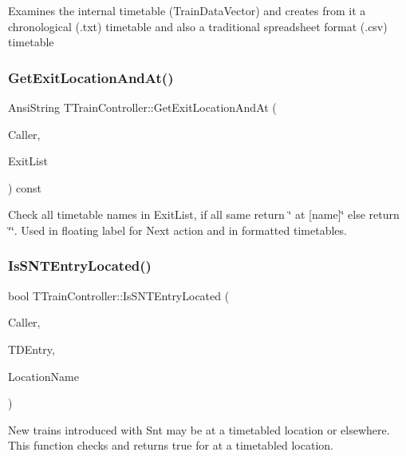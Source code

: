Examines the internal timetable (Train\+Data\+Vector) and creates from it a chronological (.txt) timetable and also a traditional spreadsheet format (.csv) timetable \mbox{\label{class_t_train_controller_ae6c904f201d8bb23b3c0714226244890}} 
\subsubsection{\texorpdfstring{Get\+Exit\+Location\+And\+At()}{GetExitLocationAndAt()}}
{\footnotesize\ttfamily Ansi\+String T\+Train\+Controller\+::\+Get\+Exit\+Location\+And\+At (\begin{DoxyParamCaption}\item[{int}]{Caller,  }\item[{T\+Exit\+List \&}]{Exit\+List }\end{DoxyParamCaption}) const}

Check all timetable names in Exit\+List, if all same return \char`\"{} at \mbox{[}name\mbox{]}\char`\"{} else return \char`\"{}\char`\"{}. Used in floating label for Next action and in formatted timetables. \mbox{\label{class_t_train_controller_a61cdbf0085d24c76aa84e7d5e1d11ead}} 
\subsubsection{\texorpdfstring{Is\+S\+N\+T\+Entry\+Located()}{IsSNTEntryLocated()}}
{\footnotesize\ttfamily bool T\+Train\+Controller\+::\+Is\+S\+N\+T\+Entry\+Located (\begin{DoxyParamCaption}\item[{int}]{Caller,  }\item[{const \mbox{\hyperlink{class_t_train_data_entry}{T\+Train\+Data\+Entry}} \&}]{T\+D\+Entry,  }\item[{Ansi\+String \&}]{Location\+Name }\end{DoxyParamCaption})}

New trains introduced with \textquotesingle{}Snt\textquotesingle{} may be at a timetabled location or elsewhere. This function checks and returns true for at a timetabled location. \mbox{\label{class_t_train_controller_a853ddf9799c9fd7063c81ffa1dc754d7}} 
